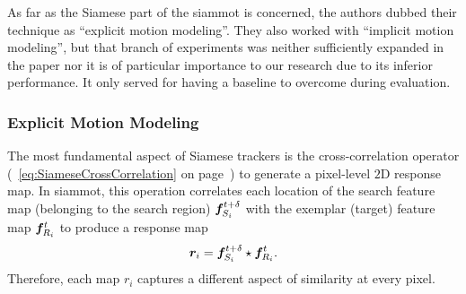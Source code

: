 As far as the Siamese part of the \gls{siammot} is concerned, the authors dubbed their technique as ``explicit motion modeling''. They also worked with ``implicit motion modeling'', but that branch of experiments was neither sufficiently expanded in the paper nor it is of particular importance to our research due to its inferior performance. It only served for having a baseline to overcome during evaluation.

\subsubsection{Explicit Motion Modeling}

The most fundamental aspect of Siamese trackers is the cross-correlation operator (\sectiontext{}~\ref{eq:SiameseCrossCorrelation} on page~\pageref{eq:SiameseCrossCorrelation}) to generate a pixel-level $2$D response map. In \gls{siammot}, this operation correlates each location of the search feature map (belonging to the search region) $\bm{f}_{S_i}^{t + \delta}$ with the exemplar (target) feature map $\bm{f}_{R_i}^{t}$ to produce a response map
\begin{equation}
    \bm{r}_{i} = \bm{f}_{S_i}^{t + \delta} \star \bm{f}_{R_i}^{t}.
\end{equation}
Therefore, each map $r_i$ captures a different aspect of similarity at every pixel.

